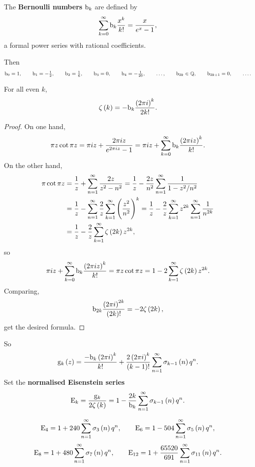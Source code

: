 \begin{definition}
The \textbf{Bernoulli numbers} $ \mathrm{b}_k $ are defined by
$$ \sum_{k = 0}^\infty \mathrm{b}_k\dfrac{x^k}{k!} = \dfrac{x}{e^x - 1}, $$
a formal power series with rational coefficients.
\end{definition}

Then
$$ \mathrm{b}_0 = 1, \qquad \mathrm{b}_1 = -\tfrac{1}{2}, \qquad \mathrm{b}_2 = \tfrac{1}{6}, \qquad \mathrm{b}_3 = 0, \qquad \mathrm{b}_4 = -\tfrac{1}{20}, \qquad \dots, \qquad \mathrm{b}_{2k} \in \mathbb{Q}, \qquad \mathrm{b}_{2k + 1} = 0, \qquad \dots. $$

\pagebreak

\begin{proposition}
For all even $ k $,
$$ \zeta\br{k} = -\b_k\dfrac{\br{2\pi i}^k}{2k!}. $$
\end{proposition}

\begin{proof}
On one hand,
$$ \pi z\cot \pi z = \pi iz + \dfrac{2\pi iz}{e^{2\pi iz} - 1} = \pi iz + \sum_{k = 0}^\infty \b_k\dfrac{\br{2\pi iz}^k}{k!}. $$
On the other hand,
\begin{align*}
\pi\cot \pi z
& = \dfrac{1}{z} + \sum_{n = 1}^\infty \dfrac{2z}{z^2 - n^2}
= \dfrac{1}{z} - \dfrac{2z}{n^2}\sum_{n = 1}^\infty \dfrac{1}{1 - z^2 / n^2} \\
& = \dfrac{1}{z} - \sum_{n = 1}^\infty \dfrac{2}{z}\sum_{k = 1}^\infty \br{\dfrac{z^2}{n^2}}^k
= \dfrac{1}{z} - \dfrac{2}{z}\sum_{k = 1}^\infty z^{2k}\sum_{n = 1}^\infty \dfrac{1}{n^{2k}} \\
& = \dfrac{1}{z} - \dfrac{2}{z}\sum_{k = 1}^\infty \zeta\br{2k}z^{2k},
\end{align*}
so
$$ \pi iz + \sum_{k = 0}^\infty \b_k\dfrac{\br{2\pi iz}^k}{k!} = \pi z\cot \pi z = 1 - 2\sum_{k = 1}^\infty \zeta\br{2k}z^{2k}. $$
Comparing,
$$ \b_{2k}\dfrac{\br{2\pi i}^{2k}}{\br{2k}!} = -2\zeta\br{2k}, $$
get the desired formula.
\end{proof}

So
$$ \g_k\br{z} = \dfrac{-\b_k\br{2\pi i}^k}{k!} + \dfrac{2\br{2\pi i}^k}{\br{k - 1}!}\sum_{n = 1}^\infty \sigma_{k - 1}\br{n}q^n. $$
Set the \textbf{normalised Eisenstein series}
$$ \E_k = \dfrac{\g_k}{2\zeta\br{k}} = 1 - \dfrac{2k}{\b_k}\sum_{n = 1}^\infty \sigma_{k - 1}\br{n}q^n. $$

\begin{example*}
$$ \E_4 = 1 + 240\sum_{n = 1}^\infty \sigma_3\br{n}q^n, \qquad \E_6 = 1 - 504\sum_{n = 1}^\infty \sigma_5\br{n}q^n, $$
$$ \E_8 = 1 + 480\sum_{n = 1}^\infty \sigma_7\br{n}q^n, \qquad \E_{12} = 1 + \dfrac{65520}{691}\sum_{n = 1}^\infty \sigma_{11}\br{n}q^n. $$
\end{example*}

